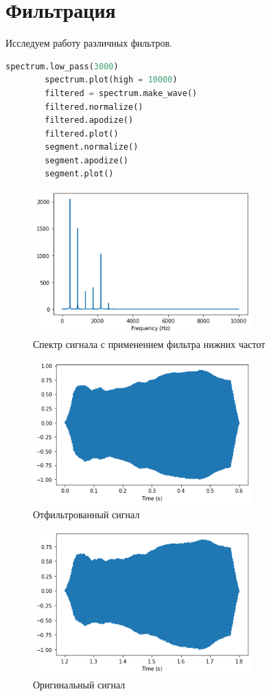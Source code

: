 \documentclass[a4paper, 12pt]{report}
\begin{document}
	\chapter{Фильтрация}
	Исследуем работу различных фильтров.
	\begin{lstlisting}[language=Python,caption=Функция для фильтра нижних частот]
		spectrum.low_pass(3000)
		spectrum.plot(high = 10000)
		filtered = spectrum.make_wave()
		filtered.normalize()
		filtered.apodize()
		filtered.plot()
		segment.normalize()
		segment.apodize()
		segment.plot()
	\end{lstlisting}
	\begin{figure}[H]
		\centering
		\includegraphics[width=0.75\textwidth]{spectrum3.png}
		\caption{Спектр сигнала с применением фильтра нижних частот}
		\label{fig:spectrum3}
	\end{figure}
	\begin{figure}[H]
		\centering
		\includegraphics[width=0.75\textwidth]{wave_filter.png}
		\caption{Отфильтрованный сигнал}
		\label{fig:wave_filter}
	\end{figure}
	\begin{figure}[H]
		\centering
		\includegraphics[width=0.75\textwidth]{segment_filter.png}
		\caption{Оригинальный сигнал}
		\label{fig:segment_filter}
	\end{figure}
\end{document}
